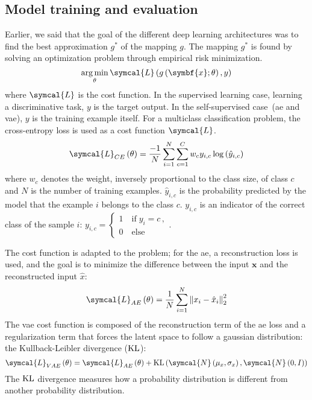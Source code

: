 \documentclass[../main.tex]{subfiles}
\begin{document}
 \subsection{Model training and evaluation}
	 Earlier, we said that the goal of the different deep learning architectures was to find the best approximation \(g^{*}\) of the mapping \(g\).
	 The mapping \(g^{*}\) is found by solving an optimization problem through empirical risk minimization.
	 \begin{equation}
		 \argmin_{\theta} \symcal{L}\left(g\left(\symbf{x}; \theta\right), y\right) \label{eq:dl_opt}
	 \end{equation}
	 where \(\symcal{L}\) is the cost function.
	 In the supervised learning case, learning a discriminative task, \(y\) is the target output.
	 In the self-supervised case~(\gls{ae} and \gls{vae}), \(y\) is the training example itself.
	 For a multiclass classification problem, the cross-entropy loss is used as a cost function \(\symcal{L}\).
	 \begin{equation}
		 \symcal{L}_{CE}\left(\theta\right) = \frac{-1}{N}\sum_{i=1}^{N}\sum_{c=1}^{C} w_c y_{i,c}\log\left(\hat{y}_{i,c}\right)
	 \end{equation}
	 where \(w_c\) denotes the weight, inversely proportional to the class size, of class \(c\) and \(N\) is the number of training examples.
	 \(\hat{y}_{i,c}\) is the probability predicted by the model that the example \(i\) belongs to the class \(c\).
	 \(y_{i,c}\) is an indicator of the correct class of the sample \(i\):
	 \(
	 y_{i,c} = \begin{cases}
		 1 \quad \text{if}\; y_i = c \, , \\
		 0 \quad \text{else}
	 \end{cases}
	 \).

	 The cost function is adapted to the problem; for the \gls{ae}, a reconstruction loss is used, and the goal is to minimize the difference between the input \(\symbf{x}\) and the reconstructed input \(\hat{x}\):
	 \begin{equation}
		 \symcal{L}_{AE}\left(\theta\right) = \frac{1}{N}\sum_{i=1}^{N} {\left\|x_i - \hat{x}_i \right\|}_2^{2} \label{eq:loss_ae}
	 \end{equation}
	 The \gls{vae} cost function is composed of the reconstruction term of the \gls{ae} loss and a regularization term that forces the latent space to follow a gaussian distribution: the Kullback-Leibler divergence (\(\operatorname{KL}\)):
	 \begin{equation}
		 \symcal{L}_{VAE}\left(\theta\right) = \symcal{L}_{AE}\left(\theta\right) + \KL\left(\symcal{N}\left(\mu_{x}, \sigma_{x}\right), \symcal{N}\left(0, I\right)\right)
	 \end{equation}
	 The \(\operatorname{KL}\) divergence measures how a probability distribution is different from another probability distribution.
\end{document}
